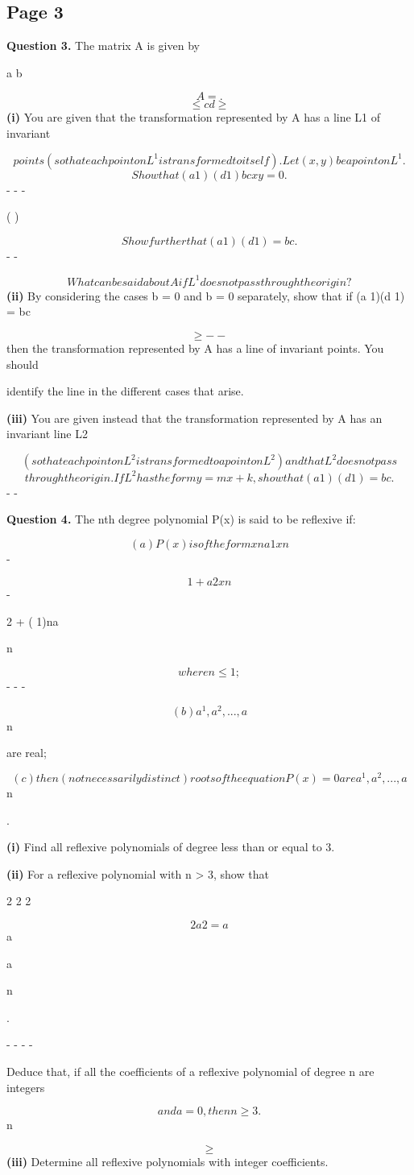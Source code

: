 \documentclass[12pt]{article}
\begin{document}
\subsection*{Page 3}
\begin{flushleft}
\bigskip\textbf{Question 3.} The matrix A is given by\par
a b\par
\[A = .\]
\[\leq c d \geq\]
\textbf{(i)} You are given that the transformation represented by A has a line L1 of invariant\par
\[points (so that each point on L^1 is transformed to itself). Let (x, y) be a point on L^1.\]
\[Show that (a 1)(d 1) bc xy = 0.\]
- - -\par
( )\par
\[Show further that (a 1)(d 1) = bc.\]
- -\par
\[What can be said about A if L^1 does not pass through the origin?\]
\textbf{(ii)} By considering the cases b = 0 and b = 0 separately, show that if (a 1)(d 1) = bc\par
\[\geq - -\]
then the transformation represented by A has a line of invariant points. You should\par
identify the line in the different cases that arise.\par
\textbf{(iii)} You are given instead that the transformation represented by A has an invariant line L2\par
\[(so that each point on L^2 is transformed to a point on L^2) and that L^2 does not pass\]
\[through the origin. If L^2 has the form y = mx + k, show that (a 1)(d 1) = bc.\]
- -\par
\bigskip\textbf{Question 4.} The nth degree polynomial P(x) is said to be reflexive if:\par
\[(a) P(x) is of the form xn a1xn\]
-\par
\[1 + a2xn\]
-\par
2 + ( 1)na\par
n\par
\[where n \leq 1;\]
- - \cdots -\par
\[(b) a^1, a^2, . . . , a\]
n\par
are real;\par
\[(c) the n (not necessarily distinct) roots of the equation P(x) = 0 are a^1, a^2, . . . , a\]
n\par
.\par
\textbf{(i)} Find all reflexive polynomials of degree less than or equal to 3.\par
\textbf{(ii)} For a reflexive polynomial with n > 3, show that\par
2 2 2\par
\[2a2 = a\]
a\par
a\par
n\par
.\par
- - - \cdots -\par
Deduce that, if all the coefficients of a reflexive polynomial of degree n are integers\par
\[and a = 0, then n \geq 3.\]
n\par
\[\geq\]
\textbf{(iii)} Determine all reflexive polynomials with integer coefficients.\par
\end{flushleft}
\end{document}
